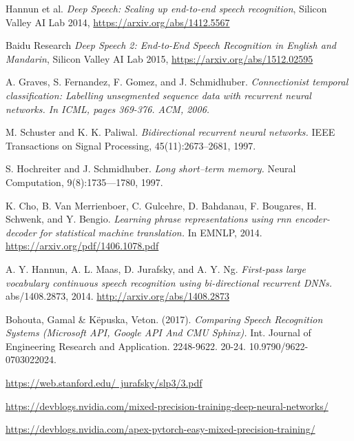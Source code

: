 \documentclass[licencjacka,en]{pracamgr}
\begin{document}
\begin{thebibliography}{99}

 Hannun et al. 
\textit{Deep Speech: Scaling up end-to-end speech recognition}, Silicon Valley AI Lab 2014, \href{https://arxiv.org/abs/1412.5567}{https://arxiv.org/abs/1412.5567}
  
 Baidu Research \textit{Deep Speech 2: End-to-End Speech Recognition in English and Mandarin}, Silicon Valley AI Lab 2015, \href{https://arxiv.org/abs/1512.02595}{https://arxiv.org/abs/1512.02595}

 A. Graves, S. Fernandez, F. Gomez, and J. Schmidhuber. \textit{Connectionist temporal classification:
Labelling unsegmented sequence data with recurrent neural networks. In ICML, pages 369-376. ACM, 2006.}

 M. Schuster and K. K. Paliwal. \textit{Bidirectional recurrent neural networks.} IEEE Transactions on Signal Processing, 45(11):2673–2681, 1997.

 S. Hochreiter and J. Schmidhuber. \textit{Long short--term memory.} Neural Computation, 9(8):1735—1780, 1997.

 K. Cho, B. Van Merrienboer, C. Gulcehre, D. Bahdanau, F. Bougares, H. Schwenk, and Y. Bengio. \textit{Learning phrase representations using rnn encoder-decoder for statistical machine translation.} In EMNLP, 2014. \href{https://arxiv.org/pdf/1406.1078.pdf}{https://arxiv.org/pdf/1406.1078.pdf}

 A. Y. Hannun, A. L. Maas, D. Jurafsky, and A. Y. Ng. \textit{First-pass large vocabulary continuous speech recognition using bi-directional recurrent DNNs.} abs/1408.2873, 2014. \href{http://arxiv.org/abs/1408.2873}{http://arxiv.org/abs/1408.2873}

 Bohouta, Gamal \& Këpuska, Veton. (2017). \textit{Comparing Speech Recognition Systems (Microsoft API, Google API And CMU Sphinx).} Int. Journal of Engineering Research and Application. 2248-9622. 20-24. 10.9790/9622-0703022024.

 \href{https://web.stanford.edu/~jurafsky/slp3/3.pdf}{https://web.stanford.edu/~jurafsky/slp3/3.pdf}

 \href{https://devblogs.nvidia.com/mixed-precision-training-deep-neural-networks/}
{https://devblogs.nvidia.com/mixed-precision-training-deep-neural-networks/}

 \href{https://devblogs.nvidia.com/apex-pytorch-easy-mixed-precision-training/}{https://devblogs.nvidia.com/apex-pytorch-easy-mixed-precision-training/}


\end{thebibliography}
\end{document}
